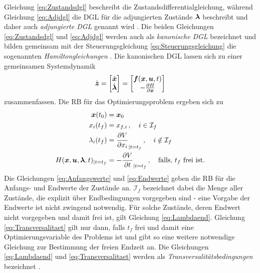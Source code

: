 Gleichung \ref{eq:Zustandsdgl} beschreibt die Zustandsdifferentialgleichung, während Gleichung \ref{eq:Adjdgl} die \gls{DGL} für die adjungierten Zustände $\boldsymbol{\lambda}$ beschreibt und daher auch \textit{adjungierte \gls{DGL}} genannt wird \cite{Konigorski.2019}. Die beiden Gleichungen \ref{eq:Zustandsdgl} und \ref{eq:Adjdgl} werden auch als \textit{kanonische \gls{DGL}} bezeichnet und bilden gemeinsam mit der Steuerungsgleichung \ref{eq:Steuerungsgleichung} die sogenannten \textit{Hamiltongleichungen} \cite{Konigorski.2019}. Die kanonischen \gls{DGL} lassen sich zu einer gemeinsamen Systemdynamik 
\begin{equation}
	\dot{\boldsymbol{z}} = \begin{bmatrix}
	\dot{\boldsymbol{x}} \\
	\dot{\boldsymbol{\lambda}}
	\end{bmatrix} = 
	\begin{bmatrix}
	\boldsymbol{f}(\boldsymbol{x},\boldsymbol{u},t) \\
	-\frac{\partial H}{\partial \boldsymbol{x}}
	\end{bmatrix} \label{eq:Sysdyn_z}
\end{equation}
zusammenfassen.
Die \gls{RB} für das Optimierungsproblem ergeben sich zu \cite{KnutGraichen.2012}
\begin{align}
\boldsymbol{x}(t_0) &= \boldsymbol{x}_0 \label{eq:Anfangswerte} \\
x_i(t_f) &= x_{f,i}\,, \quad i \in\mathcal{I}_f \label{eq:Endwerte} \\
\lambda_i(t_f) &= \frac{\partial V}{\partial x_i}_{|t=t_f}\,, \quad i \notin \mathcal{I}_f \label{eq:Lambdaend} \\
H(\boldsymbol{x},\boldsymbol{u},\boldsymbol{\lambda},t)_{|t=t_f} &= -\frac{\partial V}{\partial t}_{|t=t_f}\,,\quad \textrm{falls, $t_f$ frei ist.} \label{eq:Transversalitaet}
\end{align}
Die Gleichungen \ref{eq:Anfangswerte} und \ref{eq:Endwerte} geben die \gls{RB} für die Anfangs- und Endwerte der Zustände an. $\mathcal{I}_f$ bezeichnet dabei die Menge aller Zustände, die explizit über Endbedingungen vorgegeben sind - eine Vorgabe der Endwerte ist nicht zwingend notwendig. Für solche Zustände, deren Endwert nicht vorgegeben und damit frei ist, gilt Gleichung \ref{eq:Lambdaend}. Gleichung \ref{eq:Transversalitaet} gilt nur dann, falls $t_f$ frei und damit eine Optimierungsvariable des Problems ist und gibt so eine weitere notwendige Gleichung zur Bestimmung der freien Endzeit an. Die Gleichungen \ref{eq:Lambdaend} und \ref{eq:Transversalitaet} werden als \textit{Transversalitätsbedingungen} bezeichnet \cite{KnutGraichen.2012}. 

